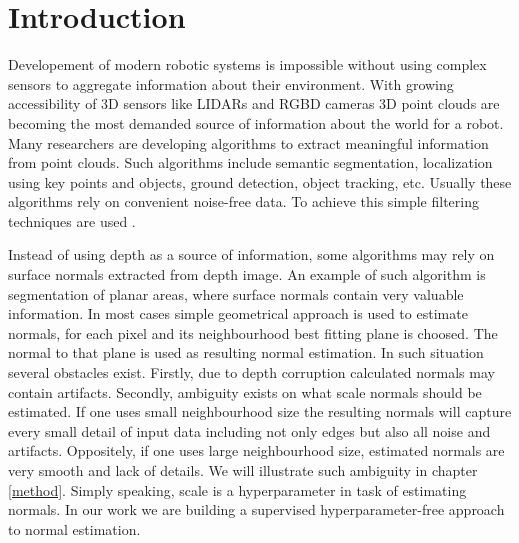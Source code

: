 \chapter{Introduction}

Developement of modern robotic systems is impossible without using complex sensors to aggregate information about their environment. With growing accessibility of 3D sensors like LIDARs and RGBD cameras 3D point clouds are becoming the most demanded source of information about the world for a robot. Many researchers are developing algorithms to extract meaningful information from point clouds. Such algorithms include semantic segmentation, localization using key points and objects, ground detection, object tracking, etc. Usually these algorithms rely on convenient noise-free data. To achieve this simple filtering techniques are used \cite{dense_planar_slam}.

Instead of using depth as a source of information, some algorithms may rely on surface normals extracted from depth image. An example of such algorithm is segmentation of planar areas, where surface normals contain very valuable information. In most cases simple geometrical approach is used to estimate normals, for each pixel and its neighbourhood best fitting plane is choosed. The normal to that plane is used as resulting normal estimation.  In such situation several obstacles exist. Firstly, due to depth corruption calculated normals may contain artifacts. Secondly, ambiguity exists on what scale normals should be estimated. If one uses small neighbourhood size the resulting normals will capture every small detail of input data including not only edges but also all noise and artifacts. Oppositely, if one uses large neighbourhood size, estimated normals are very smooth and lack of details. We will illustrate such ambiguity in chapter \ref{method}. Simply speaking, scale is a hyperparameter in task of estimating normals. In our work we are building a supervised hyperparameter-free approach to normal estimation.

